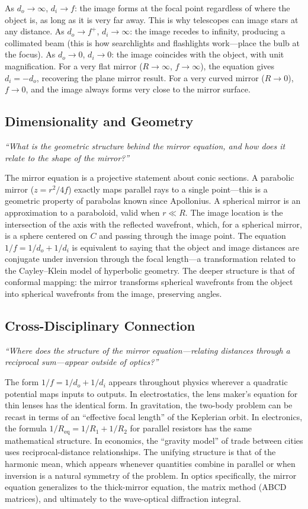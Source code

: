 As $d_{o} \to \infty$, $d_{i} \to f$: the image forms at the focal point regardless of where the object is, as long as it is very far away. This is why telescopes can image stars at any distance. As $d_{o} \to f^{+}$, $d_{i} \to \infty$: the image recedes to infinity, producing a collimated beam (this is how searchlights and flashlights work---place the bulb at the focus). As $d_{o} \to 0$, $d_{i} \to 0$: the image coincides with the object, with unit magnification. For a very flat mirror ($R \to \infty$, $f \to \infty$), the equation gives $d_{i} = -d_{o}$, recovering the plane mirror result. For a very curved mirror ($R \to 0$), $f \to 0$, and the image always forms very close to the mirror surface.

\subsection*{Dimensionality and Geometry}
\textit{``What is the geometric structure behind the mirror equation, and how does it relate to the shape of the mirror?''}

The mirror equation is a projective statement about conic sections. A parabolic mirror ($z = r^{2}/4f$) exactly maps parallel rays to a single point---this is a geometric property of parabolas known since Apollonius. A spherical mirror is an approximation to a paraboloid, valid when $r \ll R$. The image location is the intersection of the axis with the reflected wavefront, which, for a spherical mirror, is a sphere centered on $C$ and passing through the image point. The equation $1/f = 1/d_{o} + 1/d_{i}$ is equivalent to saying that the object and image distances are conjugate under inversion through the focal length---a transformation related to the Cayley--Klein model of hyperbolic geometry. The deeper structure is that of conformal mapping: the mirror transforms spherical wavefronts from the object into spherical wavefronts from the image, preserving angles.

\subsection*{Cross-Disciplinary Connection}
\textit{``Where does the structure of the mirror equation---relating distances through a reciprocal sum---appear outside of optics?''}

The form $1/f = 1/d_{o} + 1/d_{i}$ appears throughout physics wherever a quadratic potential maps inputs to outputs. In electrostatics, the lens maker's equation for thin lenses has the identical form. In gravitation, the two-body problem can be recast in terms of an ``effective focal length'' of the Keplerian orbit. In electronics, the formula $1/R_{\text{eq}} = 1/R_{1} + 1/R_{2}$ for parallel resistors has the same mathematical structure. In economics, the ``gravity model'' of trade between cities uses reciprocal-distance relationships. The unifying structure is that of the harmonic mean, which appears whenever quantities combine in parallel or when inversion is a natural symmetry of the problem. In optics specifically, the mirror equation generalizes to the thick-mirror equation, the matrix method (ABCD matrices), and ultimately to the wave-optical diffraction integral.

